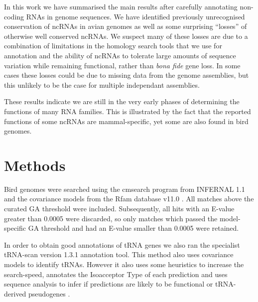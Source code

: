 \documentclass[10pt]{bmc_article}
\newenvironment{bmcformat}{\begin{raggedright}\baselineskip20pt\sloppy\setboolean{publ}{false}}{\end{raggedright}\baselineskip20pt\sloppy}
\begin{document}
\begin{bmcformat}

In this work we have summarised the main results after carefully
annotating non-coding RNAs in genome sequences. We have identified
previously unrecognised conservation of ncRNAs in avian genomes as
well as some surprising ``losses'' of otherwise well conserved
ncRNAs. We suspect many of these losses are due to a combination of
limitations in the homology search tools that we use for annotation
and the ability of ncRNAs to tolerate large amounts of sequence
variation while remaining functional, rather than \emph{bona fide}
gene loss. In some cases these losses could be due to missing data
from the genome assemblies, but this unlikely to be the case for
multiple independant assemblies.

These results indicate we are still in the very early phases of
determining the functions of many RNA families. This is illustrated by
the fact that the reported functions of some ncRNAs are
mammal-specific, yet some are also found in bird genomes. 


\section*{Methods}

Bird genomes were searched using the cmsearch program from INFERNAL
1.1 and the covariance models from the Rfam database
v11.0 \cite{Gardner:2011a,Burge:2013}. All matches above the curated GA
threshold were included. Subsequently, all hits with an E-value
greater than 0.0005 were discarded, so only matches which passed the
model-specific GA threshold and had an E-value smaller than 0.0005
were retained. 

In order to obtain good annotations of tRNA genes we also ran the
specialist tRNA-scan version 1.3.1 annotation tool. This method also
uses covariance models to identify tRNAs. However it also uses some
heuristics to increase the search-speed, annotates the Isoacceptor
Type of each prediction and uses sequence analysis to infer if
predictions are likely to be functional or tRNA-derived pseudogenes
\cite{Lowe:1997,Chan:2009}.


\end{bmcformat}
\end{document}
